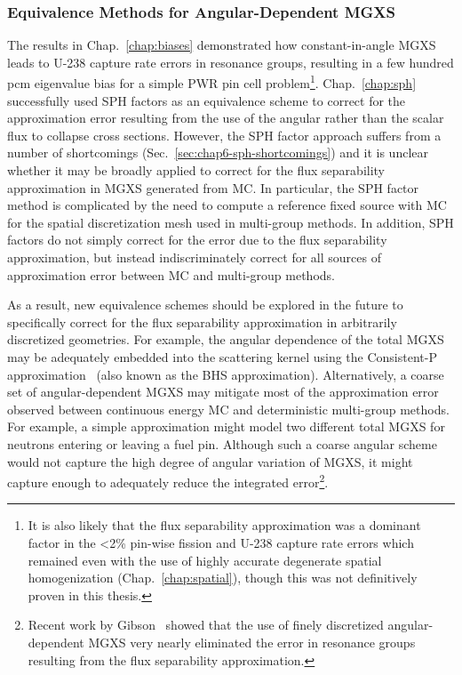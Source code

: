 
\subsubsection{Equivalence Methods for Angular-Dependent MGXS}
\label{subsubsec:chap12-angular-dependent-mgxs}

The results in Chap.~\ref{chap:biases} demonstrated how constant-in-angle \ac{MGXS} leads to U-238 capture rate errors in resonance groups, resulting in a few hundred \ac{pcm} eigenvalue bias for a simple \ac{PWR} pin cell problem\footnote{It is also likely that the flux separability approximation was a dominant factor in the <2\% pin-wise fission and U-238 capture rate errors which remained even with the use of highly accurate degenerate spatial homogenization (Chap.~\ref{chap:spatial}), though this was not definitively proven in this thesis.}. Chap.~\ref{chap:sph} successfully used \ac{SPH} factors as an equivalence scheme to correct for the approximation error resulting from the use of the angular rather than the scalar flux to collapse cross sections. However, the \ac{SPH} factor approach suffers from a number of shortcomings (Sec.~\ref{sec:chap6-sph-shortcomings}) and it is unclear whether it may be broadly applied to correct for the flux separability approximation in \ac{MGXS} generated from \ac{MC}. In particular, the \ac{SPH} factor method is complicated by the need to compute a reference fixed source with \ac{MC} for the spatial discretization mesh used in multi-group methods. In addition, \ac{SPH} factors do not simply correct for the error due to the flux separability approximation, but instead indiscriminately correct for all sources of approximation error between \ac{MC} and multi-group methods.

As a result, new equivalence schemes should be explored in the future to specifically correct for the flux separability approximation in arbitrarily discretized geometries. For example, the angular dependence of the total \ac{MGXS} may be adequately embedded into the scattering kernel using the Consistent-P approximation~\cite{bell1967transport} (also known as the BHS approximation). Alternatively, a coarse set of angular-dependent \ac{MGXS} may mitigate most of the approximation error observed between continuous energy \ac{MC} and deterministic multi-group methods. For example, a simple approximation might model two different total \ac{MGXS} for neutrons entering or leaving a fuel pin. Although such a coarse angular scheme would not capture the high degree of angular variation of \ac{MGXS}, it might capture enough to adequately reduce the integrated error\footnote{Recent work by Gibson~\cite{gibson2016thesis} showed that the use of finely discretized angular-dependent \ac{MGXS} very nearly eliminated the error in resonance groups resulting from the flux separability approximation.}. 

